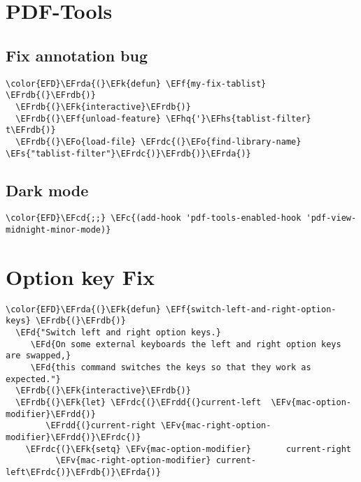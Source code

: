 \documentclass[c]{article}
\theoremstyle{plain}%
\theoremstyle{definition}
\theoremstyle{remark}
\newcommand{\EFc}[1]{\textcolor{EFc}{#1}} %
\newcommand{\EFcd}[1]{\textcolor{EFcd}{#1}} %
\newcommand{\EFs}[1]{\textcolor{EFs}{#1}} %
\newcommand{\EFd}[1]{\textcolor{EFd}{#1}} %
\newcommand{\EFk}[1]{\textcolor{EFk}{#1}} %
\newcommand{\EFf}[1]{\textcolor{EFf}{#1}} %
\newcommand{\EFv}[1]{\textcolor{EFv}{#1}} %
\newcommand{\EFo}[1]{\textcolor{EFo}{#1}} %
\newcommand{\EFhq}[1]{\textcolor{EFhq}{#1}} %
\newcommand{\EFhs}[1]{\textcolor{EFhs}{#1}} %
\newcommand{\EFrda}[1]{\textcolor{EFrda}{#1}} %
\newcommand{\EFrdb}[1]{\textcolor{EFrdb}{#1}} %
\newcommand{\EFrdc}[1]{\textcolor{EFrdc}{#1}} %
\newcommand{\EFrdd}[1]{\textcolor{EFrdd}{#1}} %
\begin{document}
\section{PDF-Tools}
\label{sec:orgb38be8e}
\subsection{Fix annotation bug}
\label{sec:org1583a7b}
\begin{Code}
\begin{Verbatim}
\color{EFD}\EFrda{(}\EFk{defun} \EFf{my-fix-tablist} \EFrdb{(}\EFrdb{)}
  \EFrdb{(}\EFk{interactive}\EFrdb{)}
  \EFrdb{(}\EFf{unload-feature} \EFhq{'}\EFhs{tablist-filter} t\EFrdb{)}
  \EFrdb{(}\EFo{load-file} \EFrdc{(}\EFo{find-library-name} \EFs{"tablist-filter"}\EFrdc{)}\EFrdb{)}\EFrda{)}
\end{Verbatim}
\end{Code}
\subsection{Dark mode}
\label{sec:org84a39be}
\begin{Code}
\begin{Verbatim}
\color{EFD}\EFcd{;;} \EFc{(add-hook 'pdf-tools-enabled-hook 'pdf-view-midnight-minor-mode)}
\end{Verbatim}
\end{Code}
\section{Option key Fix}
\label{sec:org222760d}
\begin{Code}
\begin{Verbatim}
\color{EFD}\EFrda{(}\EFk{defun} \EFf{switch-left-and-right-option-keys} \EFrdb{(}\EFrdb{)}
  \EFd{"Switch left and right option keys.}
     \EFd{On some external keyboards the left and right option keys are swapped,}
     \EFd{this command switches the keys so that they work as expected."}
  \EFrdb{(}\EFk{interactive}\EFrdb{)}
  \EFrdb{(}\EFk{let} \EFrdc{(}\EFrdd{(}current-left  \EFv{mac-option-modifier}\EFrdd{)}
        \EFrdd{(}current-right \EFv{mac-right-option-modifier}\EFrdd{)}\EFrdc{)}
    \EFrdc{(}\EFk{setq} \EFv{mac-option-modifier}       current-right
          \EFv{mac-right-option-modifier} current-left\EFrdc{)}\EFrdb{)}\EFrda{)}
\end{Verbatim}
\end{Code}
\end{document}
